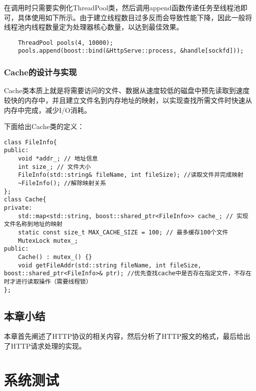 \documentclass[bachelor]{thesis-uestc}
\begin{document}
在调用时只需要实例化ThreadPool类，然后调用append函数传递任务至线程池即可，具体使用如下所示。由于建立线程数目过多反而会导致性能下降，因此一般将线程池内线程数量定为处理器核心数量，以达到最佳效果。

\begin{lstlisting}
	ThreadPool pools(4, 10000); 
	pools.append(boost::bind(&HttpServe::process, &handle[sockfd]));
\end{lstlisting}

\subsection{Cache的设计与实现}

Cache类本质上就是将需要访问的文件、数据从速度较低的磁盘中预先读取到速度较快的内存中，并且建立文件名到内存地址的映射，以实现查找所需文件时快速从内存中完成，减少I/O消耗。

下面给出Cache类的定义：
\begin{lstlisting}
class FileInfo{
public:
	void *addr_; // 地址信息
	int size_; // 文件大小
	FileInfo(std::string& fileName, int fileSize); //读取文件并完成映射
	~FileInfo(); //解除映射关系
};
class Cache{
private:
	std::map<std::string, boost::shared_ptr<FileInfo>> cache_; // 实现文件名称到地址的映射
	static const size_t MAX_CACHE_SIZE = 100; // 最多缓存100个文件
	MutexLock mutex_;
public:
	Cache() : mutex_() {}
	void getFileAddr(std::string fileName, int fileSize, boost::shared_ptr<FileInfo>& ptr); //优先查找cache中是否存在指定文件，不存在时才进行读取操作（需要线程锁）
};
\end{lstlisting}












\section{本章小结}
本章首先阐述了HTTP协议的相关内容，然后分析了HTTP报文的格式，最后给出了HTTP请求处理的实现。

\chapter{系统测试}



\thesisacknowledgement





\thesisappendix
\end{document}
